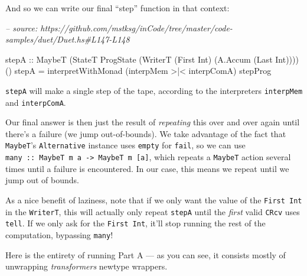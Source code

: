 \documentclass[]{article}
\newenvironment{Shaded}{}{}
\newcommand{\CommentTok}[1]{\textcolor[rgb]{0.38,0.63,0.69}{\textit{#1}}}
\newcommand{\DataTypeTok}[1]{\textcolor[rgb]{0.56,0.13,0.00}{#1}}
\newcommand{\FunctionTok}[1]{\textcolor[rgb]{0.02,0.16,0.49}{#1}}
\newcommand{\NormalTok}[1]{#1}
\newcommand{\OtherTok}[1]{\textcolor[rgb]{0.00,0.44,0.13}{#1}}
\begin{document}
And so we can write our final ``step'' function in that context:

\begin{Shaded}
\begin{Highlighting}[]
\CommentTok{-- source: https://github.com/mstksg/inCode/tree/master/code-samples/duet/Duet.hs#L147-L148}

\OtherTok{stepA ::} \DataTypeTok{MaybeT}\NormalTok{ (}\DataTypeTok{StateT} \DataTypeTok{ProgState}\NormalTok{ (}\DataTypeTok{WriterT}\NormalTok{ (}\DataTypeTok{First} \DataTypeTok{Int}\NormalTok{) (}\DataTypeTok{A.Accum}\NormalTok{ (}\DataTypeTok{Last} \DataTypeTok{Int}\NormalTok{)))) ()}
\NormalTok{stepA }\FunctionTok{=}\NormalTok{ interpretWithMonad (interpMem }\FunctionTok{>|<}\NormalTok{ interpComA) stepProg}
\end{Highlighting}
\end{Shaded}

\texttt{stepA} will make a single step of the tape, according to the
interpreters \texttt{interpMem} and \texttt{interpComA}.

Our final answer is then just the result of \emph{repeating} this over and over
again until there's a failure (we jump out-of-bounds). We take advantage of the
fact that \texttt{MaybeT}'s \texttt{Alternative} instance uses \texttt{empty}
for \texttt{fail}, so we can use
\texttt{many\ ::\ MaybeT\ m\ a\ -\textgreater{}\ MaybeT\ m\ {[}a{]}}, which
repeats a \texttt{MaybeT} action several times until a failure is encountered.
In our case, this means we repeat until we jump out of bounds.

As a nice benefit of laziness, note that if we only want the value of the
\texttt{First\ Int} in the \texttt{WriterT}, this will actually only repeat
\texttt{stepA} until the \emph{first} valid \texttt{CRcv} uses \texttt{tell}. If
we only ask for the \texttt{First\ Int}, it'll stop running the rest of the
computation, bypassing \texttt{many}!

Here is the entirety of running Part A --- as you can see, it consists mostly of
unwrapping \emph{transformers} newtype wrappers.

\begin{Shaded}
\end{Shaded}
\end{document}
